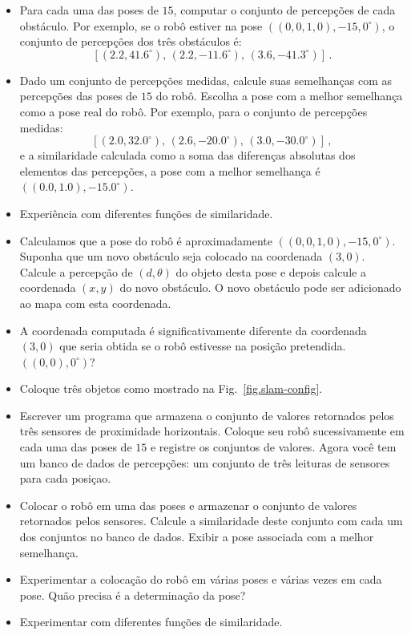 \begin{framed}
\begin{itemize}
\item Para cada uma das poses de $15$, computar o conjunto de percepções de cada obstáculo. Por exemplo, se o robô estiver na pose $((0,0,1,0),-15,0^\circ)$, o conjunto de percepções dos três obstáculos é:
\[
[( 2.2,  41.6^\circ),\,  ( 2.2, -11.6^\circ),\,  ( 3.6, -41.3^\circ)]\,.
\]
\item Dado um conjunto de percepções medidas, calcule suas semelhanças com as percepções das poses de $15$ do robô. Escolha a pose com a melhor semelhança como a pose real do robô. Por exemplo, para o conjunto de percepções medidas:
\[
[( 2.0,  32.0^\circ),\,  ( 2.6, -20.0^\circ),\,  ( 3.0, -30.0^\circ)]\,,
\]
e a similaridade calculada como a soma das diferenças absolutas dos elementos das percepções, a pose com a melhor semelhança é $((0.0, 1.0),-15.0^\circ)$.
\item Experiência com diferentes funções de similaridade.
\item Calculamos que a pose do robô é aproximadamente $((0,0, 1,0),-15,0^\circ)$. Suponha que um novo obstáculo seja colocado na coordenada $(3,0)$. Calcule a percepção de $(d,\theta)$ do objeto desta pose e depois calcule a coordenada $(x,y)$ do novo obstáculo. O novo obstáculo pode ser adicionado ao mapa com esta coordenada.
\item A coordenada computada é significativamente diferente da coordenada $(3,0)$ que seria obtida se o robô estivesse na posição pretendida. $((0,0),0^\circ)$?
\end{itemize}
\end{framed}

\begin{framed}
\begin{itemize}
\item Coloque três objetos como mostrado na Fig.~\ref{fig.slam-config}.
\item Escrever um programa que armazena o conjunto de valores retornados pelos três sensores de proximidade horizontais. Coloque seu robô sucessivamente em cada uma das poses de $15$ e registre os conjuntos de valores. Agora você tem um banco de dados de percepções: um conjunto de três leituras de sensores para cada posiçao.
\item Colocar o robô em uma das poses e armazenar o conjunto de valores retornados pelos sensores. Calcule a similaridade deste conjunto com cada um dos conjuntos no banco de dados. Exibir a pose associada com a melhor semelhança.
\item Experimentar a colocação do robô em várias poses e várias vezes em cada pose. Quão precisa é a determinação da pose?
\item Experimentar com diferentes funções de similaridade.
\end{itemize}
\end{framed}

